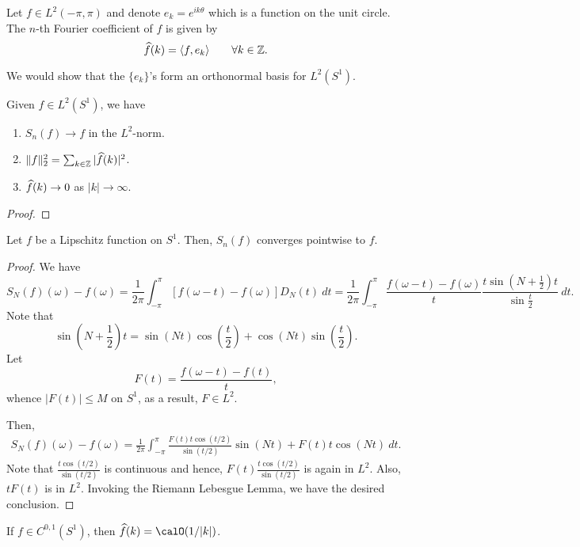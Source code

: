 Let $f\in L^2(-\pi, \pi)$ and denote $e_k = e^{ik\theta}$ which is a function on the unit circle. The $n$-th Fourier coefficient of $f$ is given by 
\begin{equation*}
    \widehat{f}(k) = \langle f, e_k\rangle\qquad\forall k\in\mathbb{Z}.
\end{equation*}

We would show that the $\{e_k\}$'s form an orthonormal basis for $L^2(S^1)$.

\begin{theorem}
    Given $f\in L^2(S^1)$, we have
    \begin{enumerate}
        \item $S_n(f)\to f$ in the $L^2$-norm.
        \item $\|f\|_2^2 = \sum_{k\in\mathbb{Z}} |\widehat{f}(k)|^2$.
        \item $\widehat{f}(k)\to 0$ as $|k|\to\infty$.
    \end{enumerate}
\end{theorem}
\begin{proof}
\end{proof}

\begin{theorem}
    Let $f$ be a Lipschitz function on $S^1$. Then, $S_n(f)$ converges pointwise to $f$.
\end{theorem}
\begin{proof}
    We have 
    \begin{equation*}
        S_N(f)(\omega) - f(\omega) = \frac{1}{2\pi}\int_{-\pi}^\pi\left[f(\omega - t) - f(\omega)\right]D_N(t)~dt = \frac{1}{2\pi}\int_{-\pi}^\pi \frac{f(\omega - t) - f(\omega)}{t}\frac{t\sin\left(N + \frac{1}{2}\right)t}{\sin\frac{t}{2}}~dt.
    \end{equation*}
    Note that 
    \begin{equation*}
        \sin\left(N + \frac{1}{2}\right)t = \sin(Nt)\cos\left(\frac{t}{2}\right) + \cos(Nt)\sin\left(\frac{t}{2}\right).
    \end{equation*}
    Let 
    \begin{equation*}
        F(t) = \frac{f(\omega - t) - f(t)}{t},
    \end{equation*}
    whence $|F(t)|\le M$ on $S^1$, as a result, $F\in L^2$.

    Then, 
    \begin{align*}
        S_N(f)(\omega) - f(\omega) = \frac{1}{2\pi}\int_{-\pi}^\pi\frac{F(t)t\cos(t/2)}{\sin(t/2)}\sin(Nt) + F(t)t\cos(Nt)~dt.
    \end{align*}
    Note that $\frac{t\cos(t/2)}{\sin(t/2)}$ is continuous and hence, $F(t)\frac{t\cos(t/2)}{\sin(t/2)}$ is again in $L^2$. Also, $tF(t)$ is in $L^2$. Invoking the Riemann Lebesgue Lemma, we have the desired conclusion.
\end{proof}

\begin{remark}
    If $f\in C^{0,1}(S^1)$, then $\wh f(k) = \calO(1/|k|)$.
\end{remark}